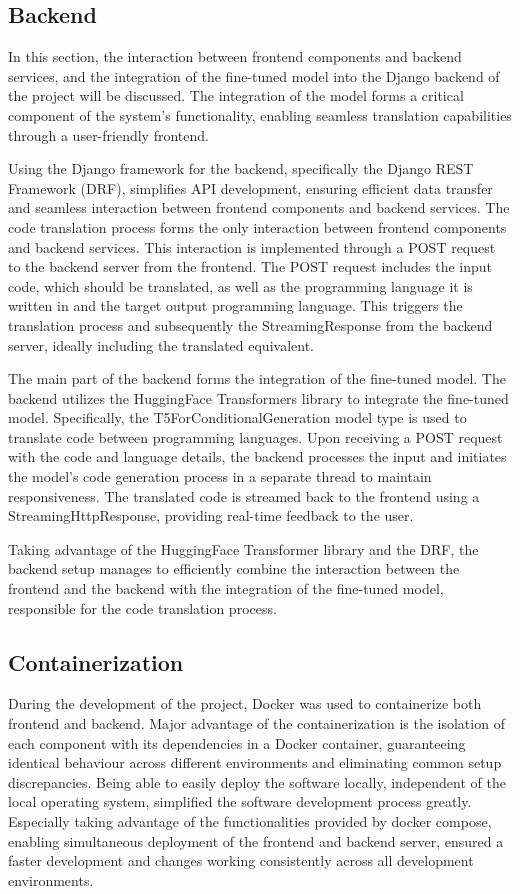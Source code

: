 \documentclass[conference]{IEEEtran}
\begin{document}
\subsection{Backend}\label{backend}
In this section, the interaction between frontend components and backend services, and the integration of the fine-tuned model into the Django backend of the project will be discussed. The integration of the model forms a critical component of the system's functionality, enabling seamless translation capabilities through a user-friendly frontend.

Using the Django framework for the backend, specifically the Django REST Framework (DRF), simplifies API development, ensuring efficient data transfer and seamless interaction between frontend components and backend services. 
The code translation process forms the only interaction between frontend components and backend services. This interaction is implemented through a POST request to the backend server from the frontend. The POST request includes the input code, which should be translated, as well as the programming language it is written in and the target output programming language. This triggers the translation process and subsequently the StreamingResponse from the backend server, ideally including the translated equivalent.

The main part of the backend forms the integration of the fine-tuned model. 
The backend utilizes the HuggingFace Transformers library to integrate the fine-tuned model. Specifically, the T5ForConditionalGeneration model type is used to translate code between programming languages. Upon receiving a POST request with the code and language details, the backend processes the input and initiates the model's code generation process in a separate thread to maintain responsiveness. The translated code is streamed back to the frontend using a StreamingHttpResponse, providing real-time feedback to the user.


Taking advantage of the HuggingFace Transformer library and the DRF, the backend setup manages to efficiently combine the interaction between the frontend and the backend with the integration of the fine-tuned model, responsible for the code translation process. 

\subsection{Containerization}
During the development of the project, Docker was used to containerize both frontend and backend. Major advantage of the containerization is the isolation of each component with its dependencies in a Docker container, guaranteeing identical behaviour across different environments and eliminating common setup discrepancies. 
Being able to easily deploy the software locally, independent of the local operating system, simplified the software development process greatly. Especially taking advantage of the functionalities provided by docker compose, enabling simultaneous deployment of the frontend and backend server, ensured a faster development and changes working consistently across all development environments. 
\end{document}
